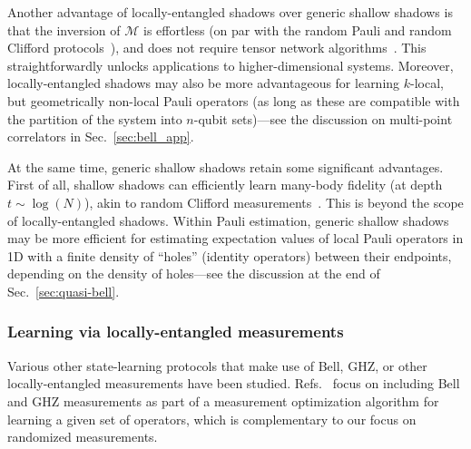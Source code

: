 \documentclass[a4paper,twocolumns,11pt,accepted=2024-03-04]{quantumarticle}
\begin{document}
Another advantage of locally-entangled shadows over generic shallow shadows is that the inversion of $\mathcal{M}$ is effortless (on par with the random Pauli and random Clifford protocols~\cite{huang_predicting_2020}), and does not require tensor network algorithms~\cite{akhtar_scalable_2023,bertoni_shallow_2022}. This straightforwardly unlocks applications to higher-dimensional systems. 
Moreover, locally-entangled shadows may also be more advantageous for learning $k$-local, but geometrically non-local Pauli operators (as long as these are compatible with the partition of the system into $n$-qubit sets)---see the discussion on multi-point correlators in Sec.~\ref{sec:bell_app}. 

At the same time, generic shallow shadows retain some significant advantages. First of all, shallow shadows can efficiently learn many-body fidelity (at depth $t \sim \log(N)$), akin to random Clifford measurements~\cite{bertoni_shallow_2022}. This is beyond the scope of locally-entangled shadows. 
Within Pauli estimation, generic shallow shadows may be more efficient for estimating expectation values of local Pauli operators in 1D with a finite density of ``holes'' (identity operators) between their endpoints, depending on the density of holes---see the discussion at the end of Sec.~\ref{sec:quasi-bell}.

\subsubsection{Learning via locally-entangled measurements}

Various other state-learning protocols that make use of Bell, GHZ, or other locally-entangled measurements have been studied.
Refs.~\cite{hamamura_efficient_2020,kondo_computationally_2022,escudero_hardware-efficient_2023} focus on including Bell and GHZ measurements as part of a measurement optimization algorithm for learning a given set of operators, which is complementary to our focus on randomized measurements. 
\end{document}
